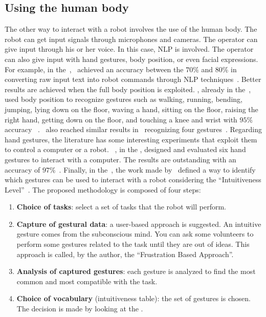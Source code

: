 \documentclass[../thesis.tex]{subfiles}
\begin{document}
\subsection{Using the human body}
The other way to interact with a robot involves the use of the human body. The robot can get input signals through microphones and cameras. The operator can give input through his or her voice. In this case, \acrfull{NLP} is involved. The operator can also give input with hand gestures, body position, or even facial expressions. For example, in the~\citeyear{paper:commanding_a_robot_with_NLP},~\citeauthor{paper:commanding_a_robot_with_NLP} achieved an accuracy between the $70\%$ and $80\%$ in converting raw input text into robot commands through \acrshort{NLP} techniques~\cite{paper:commanding_a_robot_with_NLP}. Better results are achieved when the full body position is exploited. \citeauthor{paper:example_full_body_gesture1}, already in the~\citeyear{paper:example_full_body_gesture1}, used body position to recognize gestures such as walking, running, bending, jumping, lying down on the floor, waving a hand, sitting on the floor, raising the right hand, getting down on the floor, and touching a knee and wrist with $95\%$ accuracy ~\cite{paper:example_full_body_gesture1}.~\citeauthor{paper:example_full_body_gesture2} also reached similar results in~\citeyear{paper:example_full_body_gesture2} recognizing four gestures~\cite{paper:example_full_body_gesture2}. Regarding hand gestures, the literature has some interesting experiments that exploit them to control a computer or a robot. ~\citeauthor{paper:design_and_evaluate_hand_gesture}, in the \citeyear{paper:design_and_evaluate_hand_gesture}, designed and evaluated six hand gestures to interact with a computer. The results are outstanding with an accuracy of $97\%$~\cite{paper:design_and_evaluate_hand_gesture}. Finally, in the~\citeyear{paper:intuitiveness_level}, the work made by~\citeauthor{paper:intuitiveness_level} defined a way to identify which gestures can be used to interact with a robot considering the ``Intuitiveness Level''~\cite{paper:intuitiveness_level}. The proposed methodology is composed of four steps:
\begin{enumerate}
    \item \textbf{Choice of tasks}: select a set of tasks that the robot will perform.
    \item \textbf{Capture of gestural data}: a user-based approach is suggested. An intuitive gesture comes from the subconscious mind. You can ask some volunteers to perform some gestures related to the task until they are out of ideas. This approach is called, by the author, the ``Frustration Based Approach''.
    \item \textbf{Analysis of captured gestures}: each gesture is analyzed to find the most common and most compatible with the task.
    \item \textbf{Choice of vocabulary} (intuitiveness table): the set of gestures is chosen. The decision is made by looking at the .
\end{enumerate}
\end{document}

